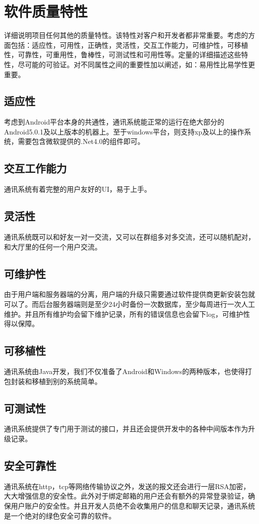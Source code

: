 \chapter{软件质量特性}


详细说明项目任何其他的质量特性。该特性对客户和开发者都非常重要。考虑的方面包括：适应性，可用性，正确性，灵活性，交互工作能力，可维护性，可移植性，可靠性，可重用性，鲁棒性，可测试性和可用性等。定量的详细描述这些特性，尽可能的可验证。对不同属性之间的重要性加以阐述，如：易用性比易学性更重要。



\section{适应性}
考虑到Android平台本身的共通性，通讯系统能正常的运行在绝大部分的Android5.0.1及以上版本的机器上。至于windows平台，则支持xp及以上的操作系统，需要包含微软提供的.Net4.0的组件即可。


\section{交互工作能力}
通讯系统有着完整的用户友好的UI，易于上手。

\section{灵活性}
通讯系统既可以和好友一对一交流，又可以在群组多对多交流，还可以随机配对，和大厅里的任何一个用户交流。

\section{可维护性}
由于用户端和服务器端的分离，用户端的升级只需要通过软件提供商更新安装包就可以了。而后台服务器端则是至少24小时备份一次数据库，至少每周进行一次人工维护。并且所有维护均会留下维护记录，所有的错误信息也会留下log，可维护性得以保障。

\section{可移植性}
通讯系统由Java开发，我们不仅准备了Android和Windows的两种版本，也使得打包封装和移植到别的系统简单。

\section{可测试性}
通讯系统提供了专门用于测试的接口，并且还会提供开发中的各种中间版本作为升级记录。

\section{安全可靠性}
通讯系统在http，tcp等网络传输协议之外，发送的报文还会进行一层RSA加密，大大增强信息的安全性。此外对于绑定邮箱的用户还会有额外的异常登录验证，确保用户账户的安全性。并且开发人员绝不会收集用户的信息和聊天记录，通讯系统是一个绝对的绿色安全可靠的软件。

